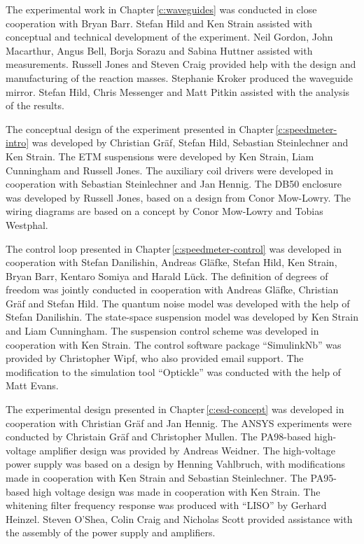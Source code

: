 The experimental work in Chapter\,\ref{c:waveguides} was conducted in close cooperation with Bryan Barr. Stefan Hild and Ken Strain assisted with conceptual and technical development of the experiment. Neil Gordon, John Macarthur, Angus Bell, Borja Sorazu and Sabina Huttner assisted with measurements. Russell Jones and Steven Craig provided help with the design and manufacturing of the reaction masses. Stephanie Kroker produced the waveguide mirror. Stefan Hild, Chris Messenger and Matt Pitkin assisted with the analysis of the results.

The conceptual design of the experiment presented in Chapter\,\ref{c:speedmeter-intro} was developed by Christian Gr\"{a}f, Stefan Hild, Sebastian Steinlechner and Ken Strain. The ETM suspensions were developed by Ken Strain, Liam Cunningham and Russell Jones. The auxiliary coil drivers were developed in cooperation with Sebastian Steinlechner and Jan Hennig. The DB50 enclosure was developed by Russell Jones, based on a design from Conor Mow-Lowry. The wiring diagrams are based on a concept by Conor Mow-Lowry and Tobias Westphal.

The control loop presented in Chapter\,\ref{c:speedmeter-control} was developed in cooperation with Stefan Danilishin, Andreas Gl\"{a}fke, Stefan Hild, Ken Strain, Bryan Barr, Kentaro Somiya and Harald L\"{u}ck. The definition of degrees of freedom was jointly conducted in cooperation with Andreas Gl\"{a}fke, Christian Gr\"{a}f and Stefan Hild. The quantum noise model was developed with the help of Stefan Danilishin. The state-space suspension model was developed by Ken Strain and Liam Cunningham. The suspension control scheme was developed in cooperation with Ken Strain. The control software package ``SimulinkNb'' was provided by Christopher Wipf, who also provided email support. The modification to the simulation tool ``Optickle'' was conducted with the help of Matt Evans.

The experimental design presented in Chapter\,\ref{c:esd-concept} was developed in cooperation with Christian Gr\"{a}f and Jan Hennig. The ANSYS experiments were conducted by Christain Gr\"{a}f and Christopher Mullen. The PA98-based high-voltage amplifier design was provided by Andreas Weidner. The high-voltage power supply was based on a design by Henning Vahlbruch, with modifications made in cooperation with Ken Strain and Sebastian Steinlechner. The PA95-based high voltage design was made in cooperation with Ken Strain. The whitening filter frequency response was produced with ``LISO'' by Gerhard Heinzel. Steven O'Shea, Colin Craig and Nicholas Scott provided assistance with the assembly of the power supply and amplifiers.

